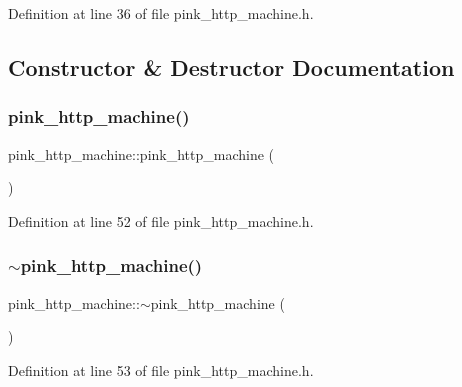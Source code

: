 Definition at line 36 of file pink\+\_\+http\+\_\+machine.\+h.



\subsection{Constructor \& Destructor Documentation}
\mbox{\label{classpink__http__machine_a8f5a3d6283cb4e9237cf1deb01548826}} 
\subsubsection{\texorpdfstring{pink\+\_\+http\+\_\+machine()}{pink\_http\_machine()}}
{\footnotesize\ttfamily pink\+\_\+http\+\_\+machine\+::pink\+\_\+http\+\_\+machine (\begin{DoxyParamCaption}{ }\end{DoxyParamCaption})\hspace{0.3cm}{\ttfamily [inline]}}



Definition at line 52 of file pink\+\_\+http\+\_\+machine.\+h.

\mbox{\label{classpink__http__machine_a38d1d6228955fc97c752d330d4c126c2}} 
\subsubsection{\texorpdfstring{$\sim$pink\+\_\+http\+\_\+machine()}{~pink\_http\_machine()}}
{\footnotesize\ttfamily pink\+\_\+http\+\_\+machine\+::$\sim$pink\+\_\+http\+\_\+machine (\begin{DoxyParamCaption}{ }\end{DoxyParamCaption})\hspace{0.3cm}{\ttfamily [inline]}}



Definition at line 53 of file pink\+\_\+http\+\_\+machine.\+h.

